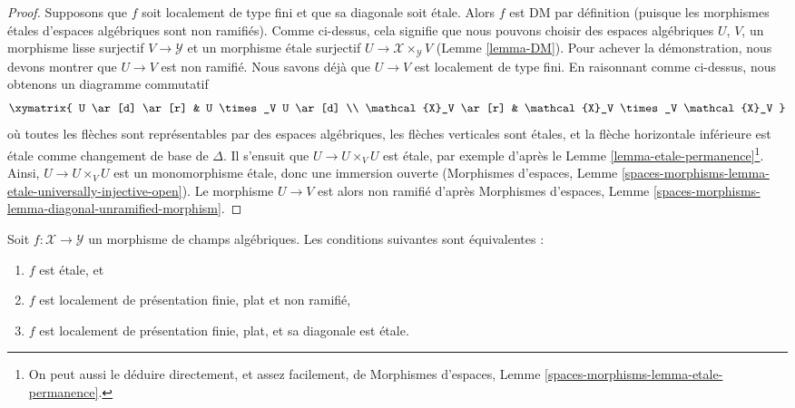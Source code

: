\begin{proof}
\medskip\noindent
Supposons que $f$ soit localement de type fini et que sa diagonale soit \'etale.
Alors $f$ est DM par d\'efinition (puisque les morphismes \'etales d'espaces
alg\'ebriques sont non ramifi\'es). Comme ci-dessus, cela signifie que nous
pouvons choisir des espaces alg\'ebriques $U$, $V$, un morphisme lisse surjectif
$V \to \mathcal{Y}$ et un morphisme \'etale surjectif
$U \to \mathcal{X} \times_\mathcal{Y} V$ (Lemme \ref{lemma-DM}).
Pour achever la d\'emonstration, nous devons montrer que $U \to V$ est non ramifi\'e.
Nous savons d\'ej\`a que $U \to V$ est localement de type fini.
En raisonnant comme ci-dessus, nous obtenons un diagramme commutatif
$$
\xymatrix{
U \ar[d] \ar[r] & U \times_V U \ar[d] \\
\mathcal{X}_V \ar[r] & \mathcal{X}_V \times_V \mathcal{X}_V
}
$$
o\`u toutes les fl\`eches sont repr\'esentables par des espaces alg\'ebriques,
les fl\`eches verticales sont \'etales, et la fl\`eche horizontale inf\'erieure
est \'etale comme changement de base de $\Delta$.
Il s'ensuit que $U \to U \times_V U$ est \'etale,
par exemple d'apr\`es le Lemme \ref{lemma-etale-permanence}\footnote{On peut
aussi le d\'eduire directement, et assez facilement, de
Morphismes d'espaces, Lemme \ref{spaces-morphisms-lemma-etale-permanence}.}.
Ainsi, $U \to U \times_V U$ est un monomorphisme \'etale,
donc une immersion ouverte (Morphismes d'espaces, Lemme
\ref{spaces-morphisms-lemma-etale-universally-injective-open}).
Le morphisme $U \to V$ est alors non ramifi\'e d'apr\`es
Morphismes d'espaces, Lemme
\ref{spaces-morphisms-lemma-diagonal-unramified-morphism}.
\end{proof}

\begin{lemma}
\label{lemma-characterize-etale}
Soit $f : \mathcal{X} \to \mathcal{Y}$ un morphisme de champs alg\'ebriques.
Les conditions suivantes sont \'equivalentes :
\begin{enumerate}
\item $f$ est \'etale, et
\item $f$ est localement de pr\'esentation finie, plat et non ramifi\'e,
\item $f$ est localement de pr\'esentation finie, plat, et sa diagonale
est \'etale.
\end{enumerate}
\end{lemma}

